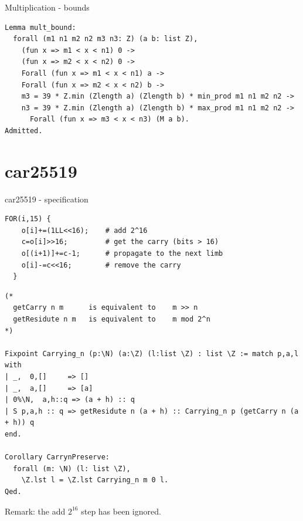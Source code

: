\documentclass[8pt]{beamer}
\begin{document}
%
%

\begin{frame}[fragile]{Multiplication - bounds}
  \begin{center}
\begin{lstlisting}[language=Coq, caption=M | Proofs of bounds, label=cod:languageC141]
Lemma mult_bound:
  forall (m1 n1 m2 n2 m3 n3: Z) (a b: list Z),
    (fun x => m1 < x < n1) 0 ->
    (fun x => m2 < x < n2) 0 ->
    Forall (fun x => m1 < x < n1) a ->
    Forall (fun x => m2 < x < n2) b ->
    m3 = 39 * Z.min (Zlength a) (Zlength b) * min_prod m1 n1 m2 n2 ->
    n3 = 39 * Z.min (Zlength a) (Zlength b) * max_prod m1 n1 m2 n2 ->
      Forall (fun x => m3 < x < n3) (M a b).
Admitted.
\end{lstlisting}

  \end{center}
\end{frame}

\section{car25519}

%
%

\begin{frame}[fragile]{car25519 - specification}
  \begin{center}

\begin{lstlisting}[language=cnacl, caption=car25519 | propagation, label=cod:languageC151]
  FOR(i,15) {
    o[i]+=(1LL<<16);    # add 2^16
    c=o[i]>>16;         # get the carry (bits > 16)
    o[(i+1)]+=c-1;      # propagate to the next limb
    o[i]-=c<<16;        # remove the carry
  }
\end{lstlisting}

\begin{lstlisting}[language=Coq, caption=car25519 | Proofs of correctness, label=cod:languageC152]
(*
  getCarry n m      is equivalent to    m >> n
  getResidute n m   is equivalent to    m mod 2^n
*)

Fixpoint Carrying_n (p:\N) (a:\Z) (l:list \Z) : list \Z := match p,a,l with
| _,  0,[]     => []
| _,  a,[]     => [a]
| 0%\N,  a,h::q => (a + h) :: q
| S p,a,h :: q => getResidute n (a + h) :: Carrying_n p (getCarry n (a + h)) q
end.

Corollary CarrynPreserve:
  forall (m: \N) (l: list \Z),
    \Z.lst l = \Z.lst Carrying_n m 0 l.
Qed.
\end{lstlisting}

Remark: the add $2^{16}$ step has been ignored.
  \end{center}
\end{frame}
\end{document}
